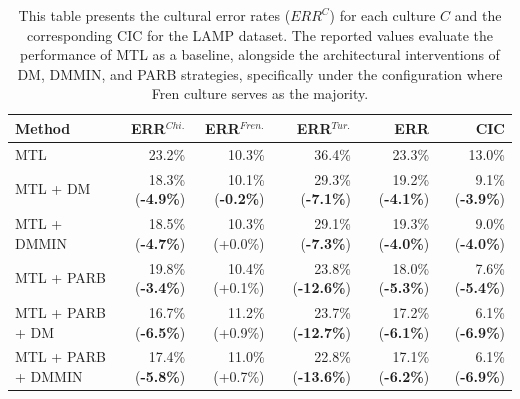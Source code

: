 %
%
\begin{table}
\centering
\scriptsize
\begin{tabular}{lrrrrr}
\toprule
\textbf{Method} & \textbf{ERR$^{Chi.}$} & \textbf{ERR$^{Fren.}$} & \textbf{ERR$^{Tur.}$} & \textbf{ERR} & \textbf{CIC} \\
\midrule							
MTL          & 23.2\% & 10.3\% & 36.4\% & 23.3\% & 13.0\% \\
MTL +  DM    & 18.3\% (\textbf{-4.9\%}) & 10.1\% (\textbf{-0.2\%}) & 29.3\% (\textbf{-7.1\%}) & 19.2\% (\textbf{-4.1\%}) & 9.1\% (\textbf{-3.9\%}) \\
MTL +  DMMIN & 18.5\% (\textbf{-4.7\%}) & 10.3\% (+0.0\%) & 29.1\% (\textbf{-7.3\%}) & 19.3\% (\textbf{-4.0\%}) & 9.0\% (\textbf{-4.0\%}) \\
\hline
MTL + PARB     & 19.8\% (\textbf{-3.4\%}) & 10.4\% (+0.1\%) & 23.8\% (\textbf{-12.6\%}) & 18.0\% (\textbf{-5.3\%}) & 7.6\% (\textbf{-5.4\%}) \\
MTL + PARB + DM & 16.7\% (\textbf{-6.5\%}) & 11.2\% (+0.9\%) & 23.7\% (\textbf{-12.7\%}) & 17.2\% (\textbf{-6.1\%}) & 6.1\% (\textbf{-6.9\%}) \\
MTL + PARB + DMMIN & 17.4\% (\textbf{-5.8\%}) & 11.0\% (+0.7\%) & 22.8\% (\textbf{-13.6\%}) & 17.1\% (\textbf{-6.2\%}) & 6.1\% (\textbf{-6.9\%}) \\
\bottomrule
\end{tabular}
\caption{This table presents the cultural error rates ($ERR^C$) for each culture $C$ and the corresponding CIC for the LAMP dataset. The reported values evaluate the performance of MTL as a baseline, alongside the architectural interventions of DM, DMMIN, and PARB strategies, specifically under the configuration where Fren culture serves as the majority.}
\label{ch3:tab:mtl_and_da:LF}
\end{table}
%
%
